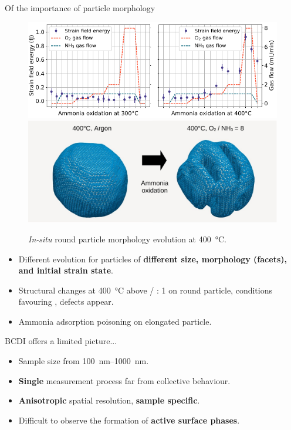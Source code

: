 \documentclass[final]{beamer}
\newlength{\colwidth}
\begin{document}
\begin{frame}[t]
\begin{columns}[t]
\begin{column}{\colwidth}
\begin{exampleblock}{Of the importance of particle morphology}
        \begin{figure}
            \centering
            \includegraphics[width=0.95\colwidth]{Figures/SFE.pdf}
            \includegraphics[width=0.95\colwidth]{Figures/B7BeforeAndAfter.pdf}
            \caption{\textit{In-situ} round particle morphology evolution at \qty{400}{\degreeCelsius}.}
            \label{fig:SFE}
        \end{figure}

        \begin{itemize}
            \itemsep 1.5ex
            \item Different evolution for particles of \textbf{different size, morphology (facets), and initial strain state}.
            \item Structural changes at \qty{400}{\degreeCelsius} above  /  : 1 on round particle, conditions favouring , defects appear.
            \item Ammonia adsorption poisoning on elongated particle.
        \end{itemize}
        
    \end{exampleblock}
    
    \begin{block}{BCDI offers a limited picture...}
        \begin{itemize}
            \itemsep 1.5ex
            \item Sample size from \qtyrange{100}{1000}{\nm}.
            \item \textbf{Single} measurement process \rightarrow far from collective behaviour.
            \item \textbf{Anisotropic} spatial resolution, \textbf{sample specific}.
            \item Difficult to observe the formation of \textbf{active surface phases}.
        \end{itemize}


\end{block}
\end{column}
\end{columns}
\end{frame}
\end{document}
